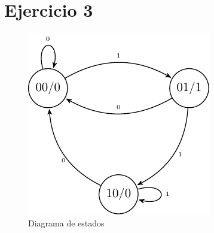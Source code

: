 \section{Ejercicio 3}

\begin{table}[H]
	\begin{center}
	\caption{Estados utilizados}
	\end{center}
	\label{Estados_Ej3}
\end{table}

\begin{table}[H]
\begin{center}
\label{Tabla_de_transiciones_Ej3}
\caption{Tabla de transiciones}
\end{center}
\end{table}

 \begin{figure}[H]
\begin{center}
\includegraphics[scale=0.75]{Ejercicio3/Diagramas/TransicionesEj3}
\caption{Diagrama de estados}
\end{center}
\label{Diagrama_de_estados_Ej3}
\end{figure}

